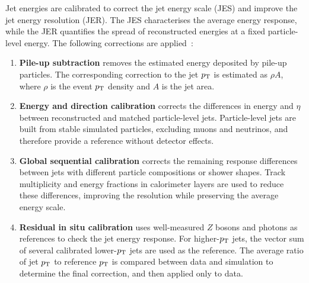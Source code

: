 Jet energies are calibrated to correct the jet energy scale (JES) and improve the jet energy resolution (JER).
The JES characterises the average energy response, while the JER quantifies the spread of reconstructed energies at a fixed particle-level energy.
The following corrections are applied~\cite{ATLAS2021JetCalibration}:
\begin{enumerate}
    \item \textbf{Pile-up subtraction} removes the estimated energy deposited by pile-up particles. The corresponding correction to the jet $p_{\mathrm{T}}$ is estimated as $\rho A$, where $\rho$ is the event $p_{\mathrm{T}}$ density and $A$ is the jet area.
    \item \textbf{Energy and direction calibration} corrects the differences in energy and $\eta$ between reconstructed and matched particle-level jets. Particle-level jets are built from stable simulated particles, excluding muons and neutrinos, and therefore provide a reference without detector effects.
    \item \textbf{Global sequential calibration} corrects the remaining response differences between jets with different particle compositions or shower shapes. Track multiplicity and energy fractions in calorimeter layers are used to reduce these differences, improving the resolution while preserving the average energy scale.
    \item \textbf{Residual in situ calibration} uses well-measured $Z$ bosons and photons as references to check the jet energy response. For higher-$p_{\mathrm{T}}$ jets, the vector sum of several calibrated lower-$p_{\mathrm{T}}$ jets are used as the reference. The average ratio of jet $p_{\mathrm{T}}$ to reference $p_{\mathrm{T}}$ is compared between data and simulation to determine the final correction, and then applied only to data.
\end{enumerate}
